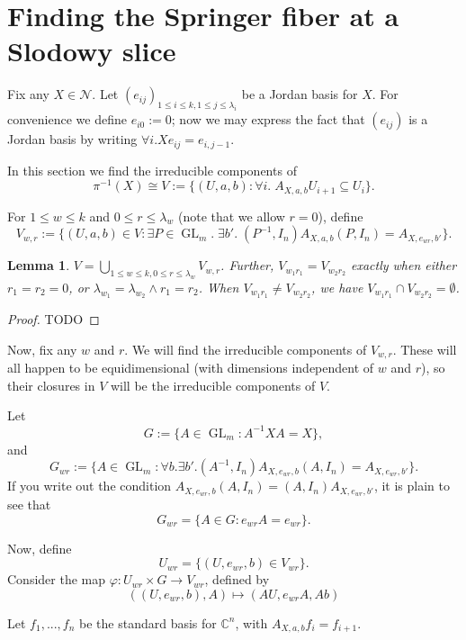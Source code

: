\documentclass[12pt,psamsfonts]{article}
\DeclareMathOperator{\GL}{GL}
\newtheorem{lemma}[theorem]{Lemma}
\begin{document}
\section{Finding the Springer fiber at a Slodowy slice}
\par Fix any \(X \in \mathcal{N}\).
Let \((e_{ij})_{1 \leq i \leq k, 1 \leq j \leq \lambda_i}\) be a Jordan basis for \(X\).
For convenience we define \(e_{i0} := 0\); now we may express the fact that \((e_{ij})\) is a Jordan basis by writing \(\forall i. Xe_{ij} = e_{i,j - 1}\).
\par In this section we find the irreducible components of
\[\pi^{-1}(X) \cong V := \{(U, a, b) : \forall i. \; A_{X, a, b} U_{i + 1} \subseteq U_i\}.\]
\par For \(1 \leq w \leq k\) and \(0 \leq r \leq \lambda_w\) (note that we allow \(r = 0\)), define 
\[V_{w,r} := \{(U, a, b) \in V : \exists P \in \GL_{m}. \; \exists b'. \; (P^{-1}, I_n) A_{X, a, b} (P, I_n) = A_{X, e_{wr}, b'} \}.\]

\begin{lemma}
    \(V = \bigcup_{1 \leq w \leq k, 0 \leq r \leq \lambda_{w}} V_{w,r}\).
    Further, \(V_{w_1r_1} = V_{w_2r_2}\) exactly when either \(r_1 = r_2 = 0\), or \(\lambda_{w_1} = \lambda_{w_2} \land r_1 = r_2\).
    When \(V_{w_1r_1} \neq V_{w_2r_2}\), we have \(V_{w_1r_1} \cap V_{w_2r_2} = \emptyset\).
\end{lemma}
\begin{proof}
    TODO
\end{proof}
Now, fix any \(w\) and \(r\).
We will find the irreducible components of \(V_{w,r}\).
These will all happen to be equidimensional (with dimensions independent of \(w\) and \(r\)), so their closures in \(V\) will be the irreducible components of \(V\).
\par Let 
\[G := \{A \in \GL_m : A^{-1} X A = X\},\]
and 
\[G_{wr} := \{A \in \GL_m : \forall b. \exists b'. (A^{-1}, I_n) A_{X, e_{wr}, b} (A, I_n) = A_{X, e_{wr}, b'}\}.\]
If you write out the condition \(A_{X, e_{wr}, b} (A, I_n) = (A, I_n) A_{X, e_{wr}, b'}\), it is plain to see that 
\[G_{wr} = \{A \in G : e_{wr}A = e_{wr}\}.\]
\par Now, define 
\[U_{wr} = \{(U, e_{wr}, b) \in V_{wr}\}.\]
Consider the map \(\varphi : U_{wr} \times G \to V_{wr}\), defined by
\[((U, e_{wr}, b), A) \mapsto (AU, e_{wr}A, Ab)\]

Let \(f_1, ..., f_n\) be the standard basis for \(\mathbb{C}^n\), with \(A_{X, a, b} f_i = f_{i + 1}\).
\end{document}
